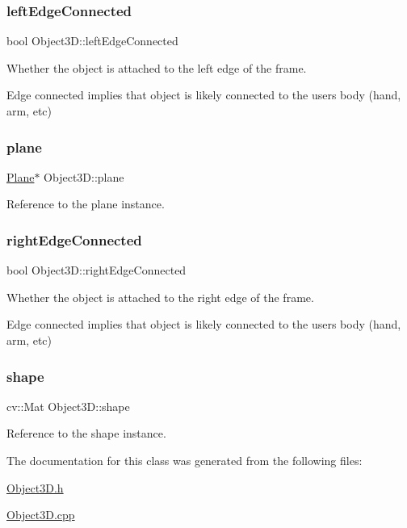 \subsubsection{\texorpdfstring{left\+Edge\+Connected}{leftEdgeConnected}}
{\footnotesize\ttfamily bool Object3\+D\+::left\+Edge\+Connected}



Whether the object is attached to the left edge of the frame. 

Edge connected implies that object is likely connected to the user\textquotesingle{}s body (hand, arm, etc) \hypertarget{class_object3_d_a0fef984a1f54d349271c474a08ebfd6d}{}\label{class_object3_d_a0fef984a1f54d349271c474a08ebfd6d} 
\subsubsection{\texorpdfstring{plane}{plane}}
{\footnotesize\ttfamily \hyperlink{class_plane}{Plane}$\ast$ Object3\+D\+::plane\hspace{0.3cm}{\ttfamily [private]}}



Reference to the plane instance. 

\hypertarget{class_object3_d_aed51e0166d44e45976f1354317fc8dd5}{}\label{class_object3_d_aed51e0166d44e45976f1354317fc8dd5} 
\subsubsection{\texorpdfstring{right\+Edge\+Connected}{rightEdgeConnected}}
{\footnotesize\ttfamily bool Object3\+D\+::right\+Edge\+Connected}



Whether the object is attached to the right edge of the frame. 

Edge connected implies that object is likely connected to the user\textquotesingle{}s body (hand, arm, etc) \hypertarget{class_object3_d_a27de2794f028136d15a4073e830980d1}{}\label{class_object3_d_a27de2794f028136d15a4073e830980d1} 
\subsubsection{\texorpdfstring{shape}{shape}}
{\footnotesize\ttfamily cv\+::\+Mat Object3\+D\+::shape\hspace{0.3cm}{\ttfamily [private]}}



Reference to the shape instance. 



The documentation for this class was generated from the following files\+:\begin{DoxyCompactItemize}
\item 
\hyperlink{_object3_d_8h}{Object3\+D.\+h}\item 
\hyperlink{_object3_d_8cpp}{Object3\+D.\+cpp}\end{DoxyCompactItemize}
